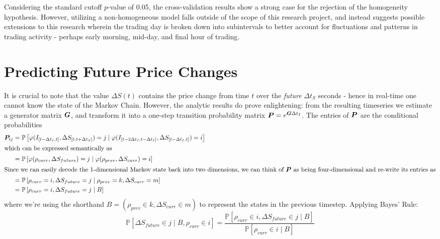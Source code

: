 Considering the standard cutoff $p$-value of 0.05, the cross-validation results show a strong case for the rejection of the homogeneity hypothesis. However, utilizing a non-homogeneous model falls outside of the scope of this research project, and instead suggests possible extensions to this research wherein the trading day is broken down into subintervals to better account for fluctuations and patterns in trading activity - perhaps early morning, mid-day, and final hour of trading.

\section{Predicting Future Price Changes}
It is crucial to note that the value $\Delta S(t)$ contains the price change from time $t$ over the \textit{future} $\Delta t_S$ seconds - hence in real-time one cannot know the state of the Markov Chain. However, the analytic results do prove enlightening: from the resulting timeseries we estimate a generator matrix $\boldsymbol{G}$, and transform it into a one-step transition probability matrix $\boldsymbol{P} = e^{\boldsymbol{G}\Delta t_I}$. The entries of $\boldsymbol{P}$ are the conditional probabilities 
\begin{align}
\boldsymbol{P}_{ij} & = \mathbb{P}\left[ \varphi( I_{[t-\Delta t_I, t]}, \Delta S_{[t,t+\Delta t_S]}) = j \; | \; \varphi( I_{[t-2\Delta t_I, t-\Delta t_I]}, \Delta S_{[t-\Delta t_I, t]} ) = i \right] \label{eq:POneStepUgly} \\
\intertext{which can be expressed semantically as}
& = \mathbb{P}\left[ \varphi( \rho_{curr}, \Delta S_{future}) = j \; | \; \varphi( \rho_{prev}, \Delta S_{curr} ) = i \right] \label{eq:POneStepNice} \\
\intertext{Since we can easily decode the 1-dimensional Markov state back into two dimensions, we can think of $\boldsymbol{P}$ as being four-dimensional and re-write its entries as}
& = \mathbb{P}\left[ \rho_{curr} = i,  \Delta S_{future} = j \; | \; \rho_{prev} = k, \Delta S_{curr} = m \right] \\
& = \mathbb{P}\left[ \rho_{curr} = i,  \Delta S_{future} = j \; | \; B \right]
\end{align}
where we're using the shorthand $B = (\rho_{prev} \in k, \Delta S_{curr} \in m)$ to represent the states in the previous timestep. Applying Bayes' Rule:
\begin{equation}\label{eq:POneStepBayes}
\mathbb{P}\left[ \Delta S_{future} \in j \; | \; B, \rho_{curr} \in i \right] = \dfrac{\mathbb{P}\left[ \rho_{curr} \in i, \Delta S_{future} \in j \; | \; B \right]}{\mathbb{P}\left[ \rho_{curr} \in i \; | \; B \right]}
\end{equation}
